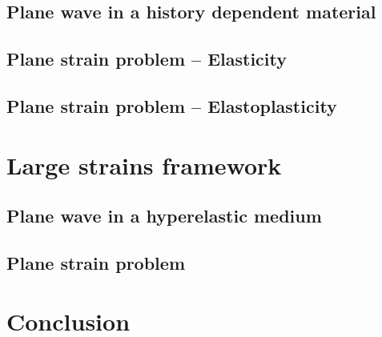 \subsection{Plane wave in a history dependent material}
\label{sec:hpp_planewave}


\subsection{Plane strain problem -- Elasticity}
\label{sec:el_planestrain}
% 
\subsection{Plane strain problem -- Elastoplasticity}
\label{sec:ep_planestrain}
% 

\section{Large strains framework}
\label{sec:he_simulations}
\subsection{Plane wave in a hyperelastic medium}
\label{sec:he_planewave}
% 

\subsection{Plane strain problem}
\label{sec:he_plate}
% 



\section{Conclusion}
